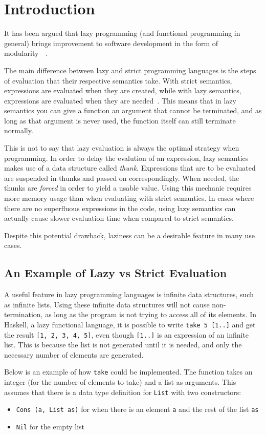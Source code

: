 \chapter{Introduction}
It has been argued that lazy programming (and functional programming in general)
brings improvement to software development in the form of
modularity~\cite{Hu1989}~\cite{Hu2015}.

The main difference between lazy and strict programming languages is the steps
of evaluation that their respective semantics take. With strict semantics,
expressions are evaluated when they are created, while with lazy semantics,
expressions are evaluated when they are needed~\cite{ThunkHas27:online}.
This means that in lazy semantics
you can give a function an argument that cannot be terminated, and as long as
that argument is never used, the function itself can still terminate normally.

This is not to say that lazy evaluation is always the optimal strategy when
programming. In order to delay the evalution of an expression, lazy semantics
makes use of a data structure called \textit{thunk}. Expressions that are to be
evaluated are suspended in thunks and passed on correspondingly. When needed,
the thunks are \textit{forced} in order to yield a usable value. Using this
mechanic requires more memory usage than when evaluating with strict semantics.
In cases where there are no superfluous expressions in the code, using lazy
semantics can actually cause slower evaluation time when compared to
strict semantics.

Despite this potential drawback, laziness can be a desirable feature in many
use cases. 

\section{An Example of Lazy vs Strict Evaluation}
\label{intro:Example}
A useful feature in lazy programming languages is
infinite data structures, such as infinite lists. Using
these infinite data structures will not cause non-termination, as long as the
program is not trying to access all of its elements. In Haskell, a lazy
functional language, it is possible to write \texttt{take 5 [1..]} and get the
result \texttt{[1, 2, 3, 4, 5]}, even though \texttt{[1..]} is
an expression of an infinite list. This is because the list is not generated
until it is needed, and only the necessary number of elements are generated.

Below is an example of how \texttt{take} could be implemented. The function
takes an integer (for the number of elements to take) and a list as arguments.
This assumes that there is a data type definition for \texttt{List} with two
constructors:
\begin{itemize}
  \item \texttt{Cons (a, List as)} for when there is an element \texttt{a} and the rest of the list \texttt{as}
  \item \texttt{Nil} for the empty list
\end{itemize}

